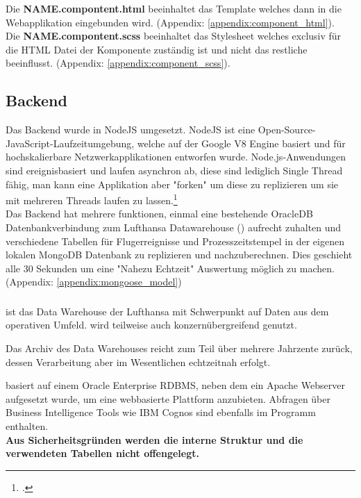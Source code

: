 	Die \textbf{NAME.compontent.html} beeinhaltet das  Template welches dann in die Webapplikation eingebunden wird. (Appendix: \ref{appendix:component_html}).\\
	
	Die \textbf{NAME.compontent.scss} beeinhaltet das  Stylesheet welches exclusiv für die HTML Datei der Komponente zuständig ist und nicht das restliche  beeinflusst. (Appendix: \ref{appendix:component_scss}). 

	\subsection{Backend}
	Das Backend wurde in NodeJS umgesetzt. NodeJS ist eine Open-Source-JavaScript-Laufzeitumgebung, welche auf der Google V8 Engine basiert und für hochskalierbare Netzwerkapplikationen entworfen wurde. Node.js-Anwendungen sind ereignisbasiert und laufen asynchron ab, diese sind lediglich Single Thread fähig, man kann eine Applikation aber "forken" um diese zu replizieren um sie mit mehreren Threads laufen zu lassen.\footcite{4}\\
	Das Backend hat mehrere funktionen, einmal eine bestehende OracleDB Datenbankverbindung zum Lufthansa Datawarehouse () aufrecht zuhalten und verschiedene Tabellen für Flugerreignisse und Prozesszeitstempel in der eigenen lokalen MongoDB Datenbank zu replizieren und nachzuberechnen. Dies geschieht alle 30 Sekunden um eine "Nahezu Echtzeit" Auswertung möglich zu machen. (Appendix: \ref{appendix:mongoose_model})



	\subsubsection{}
	 ist das Data Warehouse der Lufthansa mit Schwerpunkt auf Daten aus dem operativen Umfeld.  wird teilweise auch konzernübergreifend genutzt.

	Das Archiv des Data Warehouses reicht zum Teil über mehrere Jahrzente zurück, dessen Verarbeitung aber im Wesentlichen echtzeitnah erfolgt.

	 basiert auf einem Oracle Enterprise RDBMS, neben dem ein Apache Webserver aufgesetzt wurde, um eine webbasierte Plattform anzubieten. Abfragen über Business Intelligence Tools wie IBM Cognos sind ebenfalls im Programm enthalten.\\
	\textbf{Aus Sicherheitsgründen werden die interne Struktur und die verwendeten Tabellen nicht offengelegt.}

